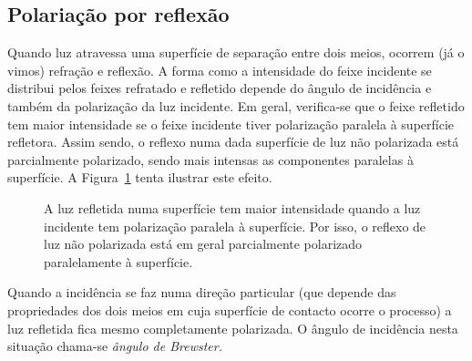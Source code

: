 \subsection{Polariação por reflexão}
Quando luz atravessa uma superfície de separação entre dois meios, ocorrem (já o
vimos) refração e reflexão. A forma como a intensidade do feixe incidente se
distribui pelos feixes refratado e refletido depende do ângulo de incidência e
também da polarização da luz incidente. Em geral, verifica-se que o feixe
refletido tem maior intensidade se o feixe incidente tiver polarização paralela
à superfície refletora. Assim sendo, o reflexo numa dada superfície de luz não
polarizada está parcialmente polarizado, sendo mais intensas as componentes
paralelas à superfície. A Figura~\ref{fig:oof160} tenta ilustrar este efeito.
\begin{figure}[htb]
    {\centering


    }
    \caption{A luz refletida numa superfície tem maior intensidade quando a luz
        incidente tem polarização paralela à superfície. Por isso, o reflexo de
        luz não polarizada está em geral parcialmente polarizado paralelamente à
        superfície.\label{fig:oof160}}      
\end{figure}

Quando a incidência se faz numa direção particular (que depende das propriedades
dos dois meios em cuja superfície de contacto ocorre o processo) a luz refletida
fica mesmo completamente polarizada.  O ângulo de incidência nesta situação
chama-se \emph{ângulo de Brewster.}

